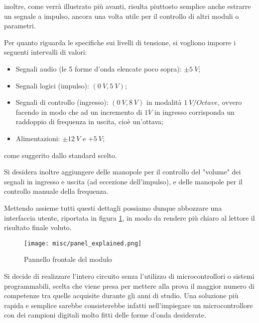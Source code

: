 inoltre, come verrà illustrato più avanti, risulta piuttosto semplice anche estrarre un
segnale a impulso, ancora una volta utile per il controllo di altri moduli o parametri.

Per quanto riguarda le specifiche sui livelli di tensione, si vogliono imporre i seguenti
intervalli di valori:

\begin{itemize}
    \item Segnali audio (le 5 forme d'onda elencate poco sopra): $\pm5\ V$;
    \item Segnali logici (impulso): $(0\ V,5\ V)$;
    \item Segnali di controllo (ingresso): $(0\ V,8\ V)$ in modalità $1\ V/Octave$, ovvero
          facendo in modo che ad un incremento di $1V$ in ingresso corrisponda un raddoppio
          di frequenza in uscita, cioè un'ottava;
    \item Alimentazioni: $\pm12\ V$ e $+5\ V$;
\end{itemize}

come suggerito dallo standard scelto.

Si desidera inoltre aggiungere delle manopole per il controllo del "volume" dei segnali
in ingresso e uscita (ad eccezione dell'impulso), e delle manopole per il controllo
manuale della frequenza.

Mettendo assieme tutti questi dettagli possiamo dunque abbozzare una interfaccia utente,
riportata in figura \ref{panel_explained}, in modo da rendere più chiaro al lettore il
risultato finale voluto.

\begin{figure}[ht]
    \centering
    \texttt{[image: misc/panel\_explained.png]}
    \caption{Pannello frontale del modulo}
    \label{panel_explained}
\end{figure}

Si decide di realizzare l'intero circuito senza l'utilizzo di microcontrollori o sistemi
programmabili, scelta che viene presa per mettere alla prova il maggior numero di competenze
tra quelle acquisite durante gli anni di studio. Una soluzione più rapida e semplice sarebbe
consisterebbe infatti nell'impiegare un microcontrollore con dei campioni digitali molto
fitti delle forme d'onda desiderate.

